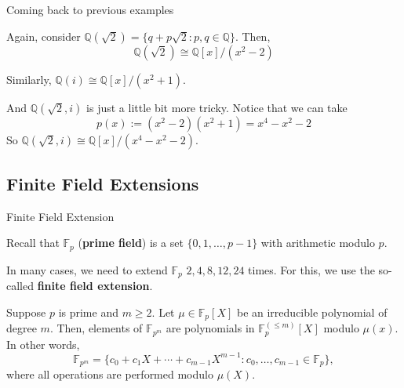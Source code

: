 \documentclass{beamer}
\begin{document}
    \begin{frame}{Coming back to previous examples}
        \begin{example}
            Again, consider $\mathbb{Q}(\sqrt{2}) = \{q+p\sqrt{2}: p,q \in \mathbb{Q}\}$. Then,
            \begin{equation*}
                \mathbb{Q}(\sqrt{2}) \cong \mathbb{Q}[x]/(x^2-2)
            \end{equation*}
        \end{example}\pause

        \begin{example}
            Similarly, $\mathbb{Q}(i) \cong \mathbb{Q}[x]/(x^2+1)$.
        \end{example}\pause

        \begin{example}
            And $\mathbb{Q}(\sqrt{2}, i)$ is just a little bit more tricky. Notice that we can take
            \begin{equation*}
                p(x) := (x^2-2)(x^2+1) = x^4-x^2-2
            \end{equation*}
            So $\mathbb{Q}(\sqrt{2}, i) \cong \mathbb{Q}[x]/(x^4-x^2-2)$.
        \end{example}
    \end{frame}

    \subsection{Finite Field Extensions}

    \begin{frame}{Finite Field Extension}
        \begin{definition}
            Recall that $\mathbb{F}_p$ (\textbf{prime field}) is a set $\{0,1,\dots,p-1\}$ with arithmetic modulo $p$.\pause
        \end{definition}

        In many cases, we need to extend $\mathbb{F}_p$ $2,4,8,12,24$ times. For this, we use the so-called \textbf{finite field extension}.\pause

        \begin{definition}
            Suppose $p$ is prime and $m \geq 2$. Let $\mu \in \mathbb{F}_p[X]$ be an irreducible polynomial of degree $m$. Then, elements of $\mathbb{F}_{p^m}$ are polynomials in $\mathbb{F}_p^{(\leq m)}[X]$ modulo $\mu(x)$. In other words,
            \begin{equation*}
                \mathbb{F}_{p^m} = \{c_0+c_1X+\cdots+c_{m-1}X^{m-1}: c_0,\dots,c_{m-1} \in \mathbb{F}_p\},
            \end{equation*}
            where all operations are performed modulo $\mu(X)$.
        \end{definition}
    \end{frame}
\end{document}
